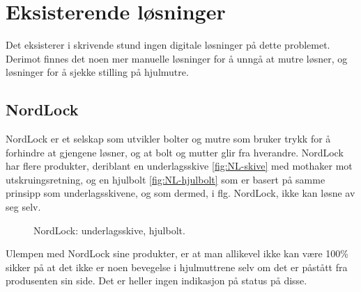 \section{Eksisterende løsninger}
\label{sec:existing-solutions}
Det eksisterer i skrivende stund ingen digitale løsninger på dette problemet. 
Derimot finnes det noen mer manuelle løsninger for å unngå at mutre løsner, 
og løsninger for å sjekke stilling på hjulmutre.
\subsection{NordLock}
NordLock er et selskap som utvikler bolter og mutre som bruker trykk for å forhindre 
at gjengene løsner, og at bolt og mutter glir fra hverandre. NordLock har flere 
produkter, deriblant en underlagsskive \ref{fig:NL-skive}\cite{NL-skive} med mothaker mot 
utskruingsretning, og en hjulbolt 
\ref{fig:NL-hjulbolt} \cite{NL-hjulbolt} som er basert på samme prinsipp som 
underlagsskivene, og som dermed, i flg. NordLock, ikke kan løsne av seg selv.
\newline
\begin{figure}[H]
%
\hfill
{}%
\caption{NordLock: \protect{\ref{fig:NL-skive}} underlagsskive, \protect{\ref{fig:NL-hjulbolt}} hjulbolt.}
\end{figure}
Ulempen med NordLock sine produkter, er at man allikevel ikke kan være 100\% sikker
på at det ikke er noen bevegelse i hjulmuttrene selv om det er påstått fra 
produsenten sin side. Det er heller ingen indikasjon på status på disse.

